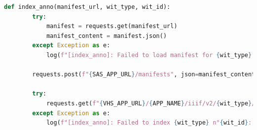 \begin{lstlisting}[language=Python]
	def index_anno(manifest_url, wit_type, wit_id):
		try:
			manifest = requests.get(manifest_url)
			manifest_content = manifest.json()
		except Exception as e:
			log(f"[index_anno]: Failed to load manifest for {wit_type} n°{wit_id}: {e}")
	
		requests.post(f"{SAS_APP_URL}/manifests", json=manifest_content)
	
		try:
			requests.get(f"{VHS_APP_URL}/{APP_NAME}/iiif/v2/{wit_type}/{wit_id}/populate/")
		except Exception as e:
			log(f"[index_anno]: Failed to index {wit_type} n°{wit_id}: {e}")\end{lstlisting}
